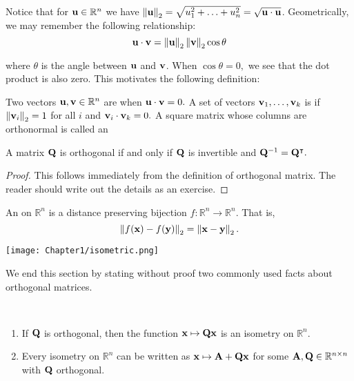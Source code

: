 Notice that for $\vu\in\R^n$ we have
$\norm{\vu}_2 = \sqrt{u_1^2 + \ldots + u_n^2 } = \sqrt{\vu \cdot \vu}$. Geometrically, we may remember the following relationship: 
$$\vu \cdot \vv = \norm{\vu}_2 \norm{\vv}_2 \cos \theta$$

where $\theta$ is the angle between $\vu$ and $\vv$. When $\cos \theta = 0,$ we see that the dot product is also zero. This motivates the following definition: 

\begin{definition}Two vectors $\vu,\vv \in \mathbb R^n$ are  when $\vu \cdot \vv = 0.$
A set of vectors $\vv_1, \ldots, \vv_k$ is  if $\norm{\vv_i}_2 = 1$ for all $i$ and $\vv_i \cdot \vv_k = 0.$
A square matrix whose columns are orthonormal is called an 
\end{definition}

\begin{proposition}
A matrix $\MQ$ is orthogonal if and only if $\MQ$ is invertible and $\MQ^{-1} = \MQ^\intercal.$
\end{proposition}
\begin{proof}
This follows immediately from the definition of orthogonal matrix. The reader should write out the details as an exercise.
\end{proof}
 
\begin{definition}An  on $\mathbb R^n$ is a distance preserving bijection $f : \mathbb R^n \rightarrow \mathbb R^n$. That is, 
$$\norm{f(\vx) - f(\vy)}_2 = \norm{\vx - \vy}_2.$$
\end{definition}

\begin{center}
  \texttt{[image: Chapter1/isometric.png]}
\end{center}

We end this section by stating without proof two commonly used facts about orthogonal matrices.

\begin{proposition}\ 
\begin{enumerate}
    \item If $\MQ$ is orthogonal, then the function $\vx \mapsto \MQ\vx$ is an isometry on $\mathbb R^n.$
    \item Every isometry on $\mathbb R^n$ can be written as $\vx \mapsto \MA + \MQ\vx$ for some $\MA, \MQ \in \mathbb R^{n \times n}$ with $\MQ$ orthogonal.
\end{enumerate}

\end{proposition}

